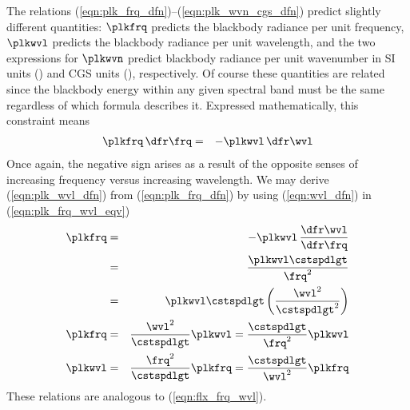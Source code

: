 \documentclass[12pt]{article}
\begin{document}
The relations (\ref{eqn:plk_frq_dfn})--(\ref{eqn:plk_wvn_cgs_dfn})
predict slightly different quantities:
$\plkfrq$ predicts the blackbody radiance per unit frequency,
$\plkwvl$ predicts the blackbody radiance per unit wavelength,
and the two expressions for $\plkwvn$ predict blackbody radiance per
unit wavenumber in SI units (\xm) and CGS units (\xcm), respectively.
Of course these quantities are related since the blackbody energy
within any given spectral band must be the same regardless of which
formula describes it.
Expressed mathematically, this constraint means
\begin{eqnarray}
\plkfrq \,\dfr\frq & = & - \plkwvl \,\dfr\wvl
\label{eqn:plk_frq_wvl_eqv}
\end{eqnarray}
Once again, the negative sign arises as a result of the opposite
senses of increasing frequency versus increasing wavelength.
We may derive (\ref{eqn:plk_wvl_dfn}) from (\ref{eqn:plk_frq_dfn}) 
by using (\ref{eqn:wvl_dfn}) in (\ref{eqn:plk_frq_wvl_eqv}) 
\begin{eqnarray}
\plkfrq & = & - \plkwvl \, \frac{\dfr\wvl}{\dfr\frq} \nonumber \\
& = & \frac{\plkwvl \cstspdlgt}{\frq^{2}} \nonumber \\
& = & \plkwvl \cstspdlgt \left( \frac{\wvl^{2}}{\cstspdlgt^{2}} \right) \nonumber \\
\plkfrq & = & \frac{\wvl^{2}}{\cstspdlgt} \plkwvl = 
\frac{\cstspdlgt}{\frq^{2}} \plkwvl \\
\label{eqn:plk_frq_wvl_dfn}
\plkwvl & = & \frac{\frq^{2}}{\cstspdlgt} \plkfrq =
\frac{\cstspdlgt}{\wvl^{2}} \plkfrq
\label{eqn:plk_wvl_frq_dfn}
\end{eqnarray}
These relations are analogous to (\ref{eqn:flx_frq_wvl}).
\end{document}
